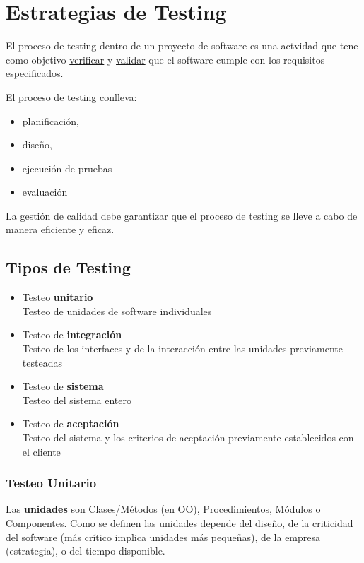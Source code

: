\chapter{Estrategias de Testing}
\label{chap:estrategias-de-testing}


El proceso de testing dentro de un proyecto de software es una actvidad que tene como objetivo \ul{verificar} y \ul{validar} que el software cumple con los requisitos especificados.

{El proceso de testing conlleva:\ns
\begin{itemize}
	\item planificación,
	\item diseño,
	\item ejecución de pruebas
	\item evaluación
\end{itemize}}


La gestión de calidad debe garantizar que el proceso de
testing se lleve a cabo de manera eficiente y eficaz.

\section{Tipos de Testing}
\begin{itemize}
	\item Testeo \textbf{unitario}\\
   Testeo de unidades de software individuales
	\item Testeo de \textbf{integración}\\
   Testeo de los interfaces y de la interacción entre las unidades previamente testeadas
	\item Testeo de \textbf{sistema}\\
   Testeo del sistema entero
	\item Testeo de \textbf{aceptación}\\
   Testeo del sistema y los criterios de aceptación previamente establecidos con el cliente
\end{itemize}

\subsection{Testeo Unitario}
Las \textbf{unidades} son Clases/Métodos (en OO), Procedimientos, Módulos o Componentes. Como se definen las unidades depende del diseño, de la criticidad del software (más crítico implica unidades más pequeñas), de la empresa (estrategia), o del tiempo disponible.


